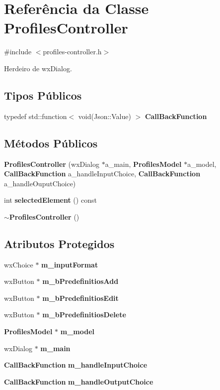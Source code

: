 \section{Referência da Classe Profiles\+Controller}
\label{class_profiles_controller}


{\ttfamily \#include $<$profiles-\/controller.\+h$>$}



Herdeiro de wx\+Dialog.

\subsection*{Tipos Públicos}
\begin{DoxyCompactItemize}
\item 
typedef std\+::function$<$ void(Json\+::\+Value) $>$ {\bf Call\+Back\+Function}
\end{DoxyCompactItemize}
\subsection*{Métodos Públicos}
\begin{DoxyCompactItemize}
\item 
{\bf Profiles\+Controller} (wx\+Dialog $\ast$a\+\_\+main, {\bf Profiles\+Model} $\ast$a\+\_\+model, {\bf Call\+Back\+Function} a\+\_\+handle\+Input\+Choice, {\bf Call\+Back\+Function} a\+\_\+handle\+Ouput\+Choice)
\item 
int {\bf selected\+Element} () const 
\item 
{\bf $\sim$\+Profiles\+Controller} ()
\end{DoxyCompactItemize}
\subsection*{Atributos Protegidos}
\begin{DoxyCompactItemize}
\item 
wx\+Choice $\ast$ {\bf m\+\_\+input\+Format}
\item 
wx\+Button $\ast$ {\bf m\+\_\+b\+Predefinitios\+Add}
\item 
wx\+Button $\ast$ {\bf m\+\_\+b\+Predefinitios\+Edit}
\item 
wx\+Button $\ast$ {\bf m\+\_\+b\+Predefinitios\+Delete}
\item 
{\bf Profiles\+Model} $\ast$ {\bf m\+\_\+model}
\item 
wx\+Dialog $\ast$ {\bf m\+\_\+main}
\item 
{\bf Call\+Back\+Function} {\bf m\+\_\+handle\+Input\+Choice}
\item 
{\bf Call\+Back\+Function} {\bf m\+\_\+handle\+Output\+Choice}
\end{DoxyCompactItemize}
